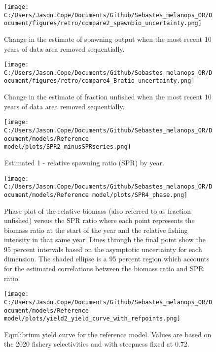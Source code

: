 \documentclass[11pt,
  english,
  letterpaper,
]{article}
\begin{document}
\begin{figure}
\centering
\texttt{[image: C:/Users/Jason.Cope/Documents/Github/Sebastes\_melanops\_OR/Document/figures/retro/compare2\_spawnbio\_uncertainty.png]}
\caption{Change in the estimate of spawning output when the most recent 10 years of data area removed sequentially.\label{fig:retro-ssb}}
\end{figure}

\begin{figure}
\centering
\texttt{[image: C:/Users/Jason.Cope/Documents/Github/Sebastes\_melanops\_OR/Document/figures/retro/compare4\_Bratio\_uncertainty.png]}
\caption{Change in the estimate of fraction unfished when the most recent 10 years of data area removed sequentially.\label{fig:retro-depl}}
\end{figure}

\newpage

\begin{figure}
\centering
\texttt{[image: C:/Users/Jason.Cope/Documents/Github/Sebastes\_melanops\_OR/Document/models/Reference model/plots/SPR2\_minusSPRseries.png]}
\caption{Estimated 1 - relative spawning ratio (SPR) by year.\label{fig:1-spr}}
\end{figure}

\clearpage

\begin{figure}
\centering
\texttt{[image: C:/Users/Jason.Cope/Documents/Github/Sebastes\_melanops\_OR/Document/models/Reference model/plots/SPR4\_phase.png]}
\caption{Phase plot of the relative biomass (also referred to as fraction unfished) versus the SPR ratio where each point represents the biomass ratio at the start of the year and the relative fishing intensity in that same year. Lines through the final point show the 95 percent intervals based on the asymptotic uncertainty for each dimension. The shaded ellipse is a 95 percent region which accounts for the estimated correlations between the biomass ratio and SPR ratio.\label{fig:phase}}
\end{figure}

\begin{figure}
\centering
\texttt{[image: C:/Users/Jason.Cope/Documents/Github/Sebastes\_melanops\_OR/Document/models/Reference model/plots/yield2\_yield\_curve\_with\_refpoints.png]}
\caption{Equilibrium yield curve for the reference model. Values are based on the 2020 fishery selectivities and with steepness fixed at 0.72.\label{fig:yield}}
\end{figure}
\end{document}
